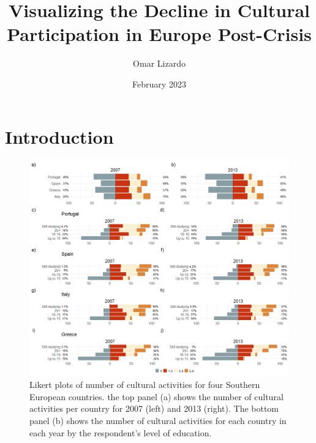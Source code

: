 \documentclass{article}
\title{Visualizing the Decline in Cultural Participation in Europe Post-Crisis}
\author{Omar Lizardo}
\date{February 2023}
\begin{document}
\maketitle

\section{Introduction}
\begin{figure}
    \centering
    \includegraphics[width=1.0\textwidth]{Plots/cult-cat2-by-year-by-country-combo.png}
    \caption{Likert plots of number of cultural activities for four Southern European countries. the top panel (a) shows the number of cultural activities per country for 2007 (left) and 2013 (right). The bottom panel (b) shows the number of cultural activities for each country in each year by the respondent's level of education.}
    \label{fig: main}
\end{figure}
\end{document}
